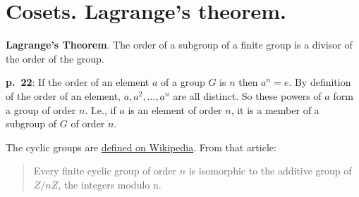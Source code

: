 \documentclass{book}
\begin{document}
\section{Cosets. Lagrange's theorem.}

{\bf Lagrange's Theorem}. The order of a subgroup of a finite group is
a divisor of the order of the group.

{\bf p.\ 22}: If the order of an element $a$ of a group $G$ is $n$
then $a^n = e$. By definition of the order of an element,
$a,a^2,...,a^n$ are all distinct. So these powers of $a$ form a group
of order $n$. I.e., if $a$ is an element of order $n$, it is a member
of a subgroup of $G$ of order $n$.

The cyclic groups are
\href{https://en.wikipedia.org/wiki/Cyclic_group}{defined on
  Wikipedia}. From that article:

\begin{quote}
Every finite cyclic group of order $n$ is isomorphic to the additive
group of $Z/nZ$, the integers modulo n.
\end{quote}

\end{document}
